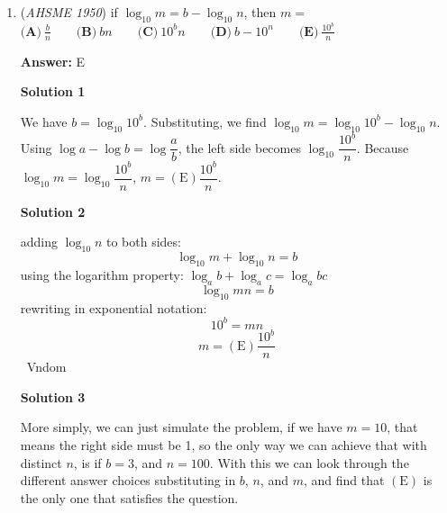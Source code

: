 \begin{enumerate}
 $\textbf{(A)}\ 725\qquad\textbf{(B)}\ 6\qquad\textbf{(C)}\ 3125\qquad\textbf{(D)}\ 5\qquad\textbf{(E)}\ \text{None of these}$

 \textbf{Answer: }D



\textbf{Solution 1}

$\log_{5}\frac{(125)(625)}{25}$ can be simplified to $\log_{5}\ (125)(25)$ since $25^2 = 625$. $125 = 5^3$ and $5^2 = 25$ so $\log_{5}\ 5^5$ would be the simplest form. In $\log_{5}\ 5^5$, $5^x = 5^5$. Therefore, $x = 5$ and the answer is $\boxed{\mathrm{(D)}\ 5}$.

 



\textbf{Solution 2}

$\log_{5}\frac{(125)(625)}{25}$ can be also represented as $\log_{5}\frac{(5^3)(5^4)}{5^2}= \log_{5}\frac{(5^7)}{5^2}= \log_{5} 5^5$ which can be solved to get $\boxed{\mathrm{(D)}\ 5}$.

 


	\item (\textit{AHSME 1950}) if $\log_{10}{m}= b-\log_{10}{n}$, then $m=$
$\textbf{(A)}\ \frac{b}{n}\qquad\textbf{(B)}\ bn\qquad\textbf{(C)}\ 10^{b}n\qquad\textbf{(D)}\ b-10^{n}\qquad\textbf{(E)}\ \frac{10^{b}}{n}$

 \textbf{Answer: }E



\textbf{Solution 1}

We have $b=\log_{10}{10^b}$. Substituting, we find $\log_{10}{m}= \log_{10}{10^b}-\log_{10}{n}$. Using $\log{a}-\log{b}=\log{\dfrac{a}{b}}$, the left side becomes $\log_{10}{\dfrac{10^b}{n}}$. Because $\log_{10}{m}=\log_{10}{\dfrac{10^b}{n}}$, $m=\boxed{\mathrm{(E) }\dfrac{10^b}{n}}$.

 



\textbf{Solution 2}

adding $\log_{10} n$ to both sides:
 \[\log_{10} m + \log_{10} n=b\]using the logarithm property: $\log_a {b} + \log_a {c}=\log_a{bc}$
 \[\log_{10} {mn}=b\]rewriting in exponential notation:
 \[10^b=mn\]
 \[m=\boxed{\mathrm{(E) }\dfrac{10^b}{n}}\]~Vndom

 



\textbf{Solution 3}

More simply, we can just simulate the problem, if we have $m = 10$, that means the right side must be 1, so the only way we can achieve that with distinct $n$, is if $b = 3$, and $n = 100$. With this we can look through the different answer choices substituting in $b$, $n$, and $m$, and find that $\boxed{\mathrm{(E)}}$ is the only one that satisfies the question.


\end{enumerate}
